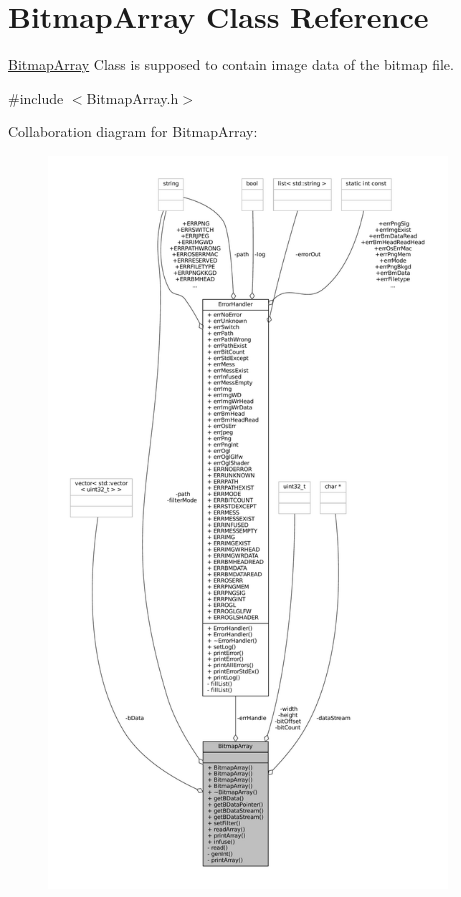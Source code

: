 \hypertarget{classBitmapArray}{}\section{Bitmap\+Array Class Reference}
\label{classBitmapArray}


\mbox{\hyperlink{classBitmapArray}{Bitmap\+Array}} Class is supposed to contain image data of the bitmap file.  




{\ttfamily \#include $<$Bitmap\+Array.\+h$>$}



Collaboration diagram for Bitmap\+Array\+:\nopagebreak
\begin{figure}[H]
\begin{center}
\leavevmode
\includegraphics[height=550pt]{classBitmapArray__coll__graph}
\end{center}
\end{figure}
